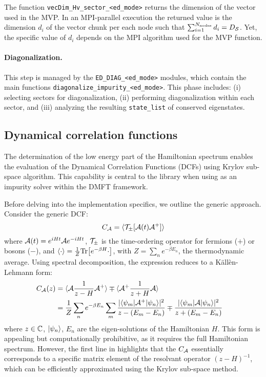 \documentclass[edipack_sp.tex]{subfiles}
\begin{document}
The function {\tt vecDim\_Hv\_sector\_<ed\_mode>} returns the 
dimension of the vector used in the
MVP. In an MPI-parallel execution the returned value is the
dimension $d_i$ of the vector chunk per each node such that
$\sum_{i=1}^{N_\mathrm{nodes}}d_i = D_\SS$. Yet, the specific value of $d_i$
depends on the MPI algorithm used for the MVP function.

\paragraph{\bf Diagonalization.}
This step is managed by the {\tt ED\_DIAG\_<ed\_mode>}
modules, which contain the main functions {\tt diagonalize\_impurity\_<ed\_mode>}.
This phase includes: (i) selecting sectors for diagonalization, (ii)
performing diagonalization within each sector, and (iii) analyzing
the resulting {\tt state\_list} of conserved eigenstates.




\subsection{Dynamical correlation functions}\label{sSecGF}
The determination of the low energy part of the Hamiltonian spectrum
enables the evaluation of the Dynamical Correlation Functions (DCFs) using Krylov sub-space algorithm.
This capability is central to the library when using \NAME as an
impurity solver within the DMFT framework.

Before delving into the implementation specifics, we outline the
generic approach. Consider the generic DCF:
\begin{equation}
  \label{eqGaa}
  C_\AA = \ibra \TT_\pm[ \AA(t) \AA^+ ]\iket
\end{equation}
where $\AA(t)=e^{iHt}\AA e^{-iHt}$, $\TT_\pm$ is the time-ordering
operator for fermions ($+$) or
bosons ($-$), and $\ibra \cdot \iket=\frac{1}{Z}\Tr{ \left[ e^{-\beta
      H}\cdot \right]}$, with $Z=\sum_ne^{-\beta E_n}$, the thermodynamic
average.
Using spectral decomposition, the expression  reduces to a
K\"all\`en-Lehmann form:
\begin{equation}\label{KLgf}
  \begin{split}
    C_\AA(z) 
    &=  \ibra \AA \frac{1}{z-H} \AA^+\iket
    \mp \ibra \AA^+ \frac{1}{z+H} \AA\iket \cr
    & =\frac{1}{Z}\sum_n e^{-\beta E_n}\sum_m
  \frac{ |\bra{\psi_m}\AA^+ \ket{\psi_n}|^2 }  {z-(E_m-E_n)}
  \mp
  \frac{ |\bra{\psi_m}\AA \ket{\psi_n}|^2 }  {z+(E_m-E_n)}\cr
\end{split}
\end{equation}
where $z\in\CCC$,  $\ket{\psi_n}$, $E_n$ are the eigen-solutions of the
Hamiltonian $H$. 
This form is appealing but computationally prohibitive, as it requires
the full Hamiltonian spectrum. However, the first line in 
highlights that the $C_\AA$ essentially corresponds to a specific
matrix element of the resolvant operator $(z-H)^{-1}$, which can be
efficiently approximated using the Krylov sub-space method.
\end{document}
